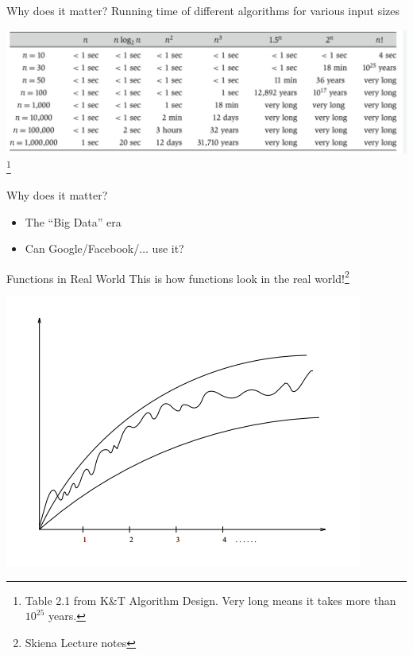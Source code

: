 \documentclass{beamer}
\begin{document}
\begin{frame}{Why does it matter?}
Running time of different algorithms for various input sizes
\begin{center}
    \includegraphics[scale=0.35]{fnVsTime.png}\footnote{Table 2.1 from K\&T Algorithm Design. Very long means it takes more than $10^{25}$ years.}
\end{center}
\end{frame}

\begin{frame}{Why does it matter?}
\begin{itemize}
\item The ``Big Data'' era
\item Can Google/Facebook/$\ldots$ use it?
\end{itemize}
\end{frame}


\begin{frame}{Functions in Real World}
This is how functions look in the real world!\footnote{Skiena Lecture notes}
\begin{center}
    \includegraphics[scale=0.4]{realWorldFunctions.png}
\end{center}
\end{frame}
\end{document}
